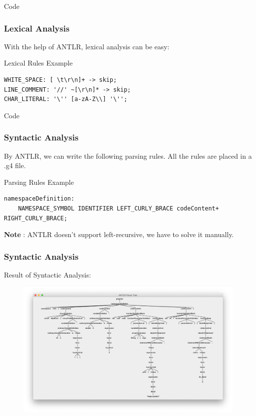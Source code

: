 \documentclass{beamer}
\begin{document}
\begin{frame}[fragile]{Code}
    \frametitle{Lexical Analysis}
    With the help of ANTLR, lexical analysis can be easy:
    \begin{block}{Lexical Rules Example}
        \begin{lstlisting}[firstnumber=1, label=glabels, xleftmargin=10pt] 
WHITE_SPACE: [ \t\r\n]+ -> skip;
LINE_COMMENT: '//' ~[\r\n]* -> skip;
CHAR_LITERAL: '\'' [a-zA-Z\\] '\'';
        \end{lstlisting}
    \end{block}
\end{frame}


\begin{frame}[fragile]{Code}
    \frametitle{Syntactic Analysis}
    By ANTLR, we can write the following parsing rules. All the rules are placed in a .g4 file.
    \begin{block}{Parsing Rules Example}
        \begin{lstlisting}[firstnumber=1, label=glabels, xleftmargin=10pt] 
namespaceDefinition:
    NAMESPACE_SYMBOL IDENTIFIER LEFT_CURLY_BRACE codeContent+ RIGHT_CURLY_BRACE;

        \end{lstlisting}
    \end{block}
   \textbf{Note} : ANTLR doesn't support left-recursive, we have to solve it manually.
\end{frame}


\begin{frame}
    \frametitle{Syntactic Analysis}
    Result of Syntactic Analysis:
    \begin{figure}[h]
        \centering
        \includegraphics[scale=0.27]{assets/ParseTree.png}
    \end{figure}
\end{frame}
\end{document}
